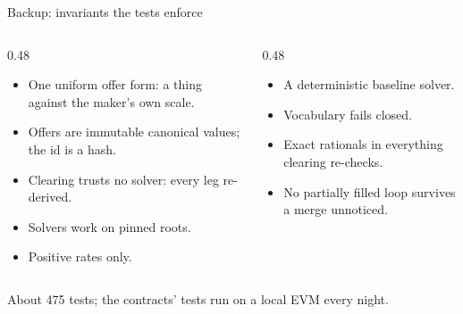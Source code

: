\documentclass[aspectratio=169,11pt]{beamer}
\begin{document}
\appendix

\begin{frame}{Backup: invariants the tests enforce}
  \begin{columns}[T]
    \begin{column}{0.48\textwidth}
      \small
      \begin{itemize}\setlength{\itemsep}{1.6mm}
        \item[U1] One uniform offer form: a thing against the maker's own scale.
        \item[U2] Offers are immutable canonical values; the id is a hash.
        \item[U3] Clearing trusts no solver: every leg re-derived.
        \item[U4] Solvers work on pinned roots.
        \item[U5] Positive rates only.
      \end{itemize}
    \end{column}
    \begin{column}{0.48\textwidth}
      \small
      \begin{itemize}\setlength{\itemsep}{1.6mm}
        \item[U6] A deterministic baseline solver.
        \item[U7] Vocabulary fails closed.
        \item[U9] Exact rationals in everything clearing re-checks.
        \item[U11] No partially filled loop survives a merge unnoticed.
      \end{itemize}
    \end{column}
  \end{columns}
  \vspace{5mm}
  {\small About 475 tests; the contracts' tests run on a local EVM every night.\par}
\end{frame}
\end{document}

